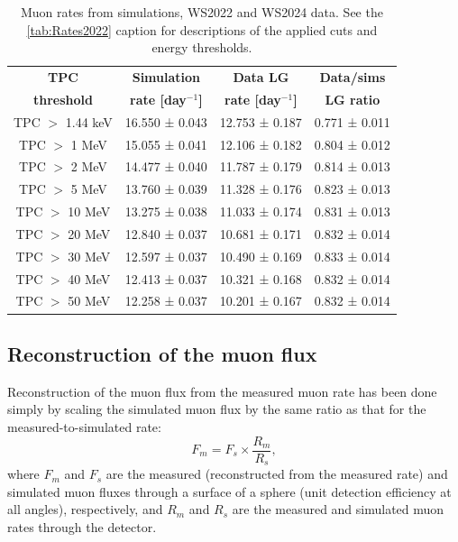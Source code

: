 \begin{center}
\begin{minipage}{\textwidth}
\def\arraystretch{1.4}%
\centering
\begin{longtable}[hbtp]{|c|c|c|c|}
\caption{Muon rates from simulations, WS2022 and WS2024 data. See the \autoref{tab:Rates2022} caption for descriptions of the applied cuts and energy thresholds. \newline}
\label{tab:Rates_all}\\
\hline
\multicolumn{1}{|c|}{\textbf{TPC}} & \multicolumn{1}{c|}{\textbf{Simulation}} & \multicolumn{1}{c|}{\textbf{Data LG}} & \multicolumn{1}{c|}{\textbf{Data/sims}}  \\ 
\multicolumn{1}{|c|}{\textbf{threshold}} & \multicolumn{1}{c|}{\textbf{rate [day$^{-1}$]}} & \multicolumn{1}{c|}{\textbf{rate [day$^{-1}$]}} & \multicolumn{1}{c|}{\textbf{LG ratio}}  \\ \hline 
\endfirsthead \hline
\endlastfoot
TPC $>$ 1.44 keV & 16.550 ± 0.043 & 12.753 ± 0.187 & 0.771 ± 0.011 \\ \hline
TPC $>$ 1 MeV & 15.055 ± 0.041 & 12.106 ± 0.182 & 0.804 ± 0.012\\ \hline
TPC $>$ 2 MeV & 14.477 ± 0.040 & 11.787 ± 0.179 & 0.814 ± 0.013 \\ \hline
TPC $>$ 5 MeV & 13.760 ± 0.039 & 11.328 ± 0.176 & 0.823 ± 0.013  \\ \hline
TPC $>$ 10 MeV & 13.275 ± 0.038 & 11.033 ± 0.174 & 0.831 ± 0.013 \\ \hline
TPC $>$ 20 MeV & 12.840 ± 0.037 & 10.681 ± 0.171 & 0.832 ± 0.014  \\ \hline
TPC $>$ 30 MeV & 12.597 ± 0.037 & 10.490 ± 0.169 & 0.833 ± 0.014  \\ \hline
TPC $>$ 40 MeV & 12.413 ± 0.037 & 10.321 ± 0.168 & 0.832 ± 0.014  \\ \hline
TPC $>$ 50 MeV & 12.258 ± 0.037 & 10.201 ± 0.167 & 0.832 ± 0.014 \\
\hline
\end{longtable}
\end{minipage}%
\end{center}

\subsection{Reconstruction of the muon flux}
Reconstruction of the muon flux from the measured muon rate has been done simply by scaling the simulated muon flux by the same ratio as that for the measured-to-simulated rate:
\begin{equation}
    F_{m} = F_{s} \times \frac{R_m}{R_s},
\label{eq:flux}
\end{equation}
where $F_{m}$ and $F_{s}$ are the measured (reconstructed from the measured rate) and simulated muon fluxes through a surface of a sphere (unit detection efficiency at all angles), respectively, and $R_{m}$ and $R_{s}$ are the measured and simulated muon rates through the detector.

